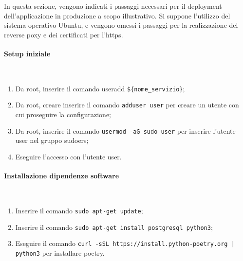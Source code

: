 \documentclass[11pt]{article} %
\begin{document}
In questa sezione, vengono indicati i passaggi necessari per il deployment dell'applicazione in produzione a scopo illustrativo. Si suppone l'utilizzo del sistema operativo Ubuntu, e vengono omessi i passaggi per la realizzazione del reverse poxy e dei certificati per l'https.

\paragraph{Setup iniziale}\mbox{}\\

\begin{enumerate}
\item Da root, inserire il comando useradd \verb|${nome_servizio}|;
\item Da root, creare inserire il comando \verb|adduser user| per creare un utente con cui proseguire la configurazione;
\item Da root, inserire il comando \verb|usermod -aG sudo user| per inserire l'utente user nel gruppo sudoers;
\item Eseguire l'accesso con l'utente user.
\end{enumerate}

\paragraph{Installazione dipendenze software}\mbox{}\\
\begin{enumerate}
\item Inserire il comando \verb|sudo apt-get update|;
\item Inserire il comando \verb|sudo apt-get install postgresql python3|;
\item Eseguire il comando \verb=curl -sSL https://install.python-poetry.org | python3= per installare poetry.
\end{enumerate}
\end{document}
